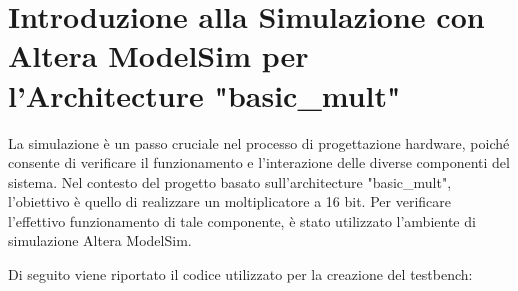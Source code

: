 \documentclass[titlepage]{report}
\begin{document}
	\section{Introduzione alla Simulazione con Altera ModelSim per l'Architecture "basic\_mult"}

		La simulazione è un passo cruciale nel processo di progettazione hardware, poiché consente di verificare il funzionamento e l'interazione delle diverse componenti del sistema. Nel contesto del progetto basato sull'architecture "basic\_mult", l'obiettivo è quello di realizzare un moltiplicatore a 16 bit. Per verificare l'effettivo funzionamento di tale componente, è stato utilizzato l'ambiente di simulazione Altera ModelSim. \par

		Di seguito viene riportato il codice utilizzato per la creazione del testbench:
		
\end{document}
